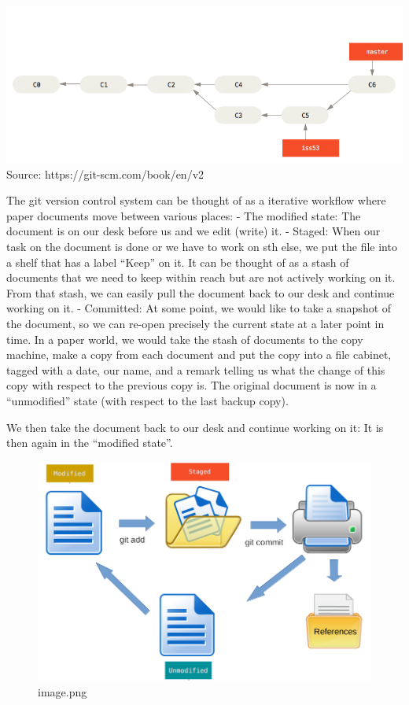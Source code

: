 \documentclass[11pt]{article}
\begin{document}
    \includegraphics{static/timeline.png}\\
Source: https://git-scm.com/book/en/v2

    The git version control system can be thought of as a iterative workflow
where paper documents move between various places: - The modified state:
The document is on our desk before us and we edit (write) it. - Staged:
When our task on the document is done or we have to work on sth else, we
put the file into a shelf that has a label ``Keep'' on it. It can be
thought of as a stash of documents that we need to keep within reach but
are not actively working on it. From that stash, we can easily pull the
document back to our desk and continue working on it. - Committed: At
some point, we would like to take a snapshot of the document, so we can
re-open precisely the current state at a later point in time. In a paper
world, we would take the stash of documents to the copy machine, make a
copy from each document and put the copy into a file cabinet, tagged
with a date, our name, and a remark telling us what the change of this
copy with respect to the previous copy is. The original document is now
in a ``unmodified'' state (with respect to the last backup copy).

We then take the document back to our desk and continue working on it:
It is then again in the ``modified state''.

    \begin{figure}
\centering
\includegraphics{static/track.png}
\caption{image.png}
\end{figure}
\end{document}

